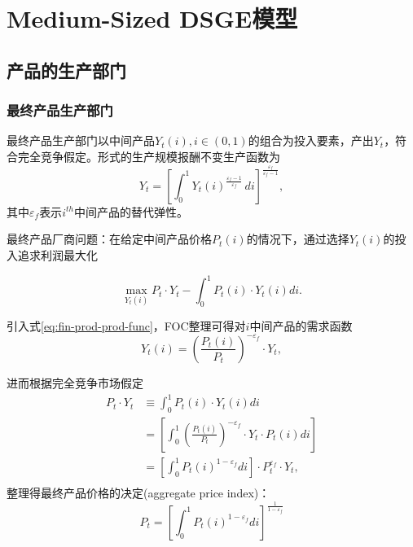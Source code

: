 \chapter{Medium-Sized DSGE模型}
\section{产品的生产部门}
\label{sec:production-sector}


\subsection{最终产品生产部门}
\label{sec:final-production-sector}
最终产品生产部门以中间产品$Y_t(i), i \in (0,1)$的组合为投入要素，产出$Y_t$，符合完全竞争假定。\cite{Dixit:1977tv}形式的生产规模报酬不变生产函数为
\begin{equation}
  \label{eq:fin-prod-prod-func-me}
  Y_t = \left[ \int_{0}^{1} Y_t(i)^{\frac{\varepsilon_{f} - 1}{\varepsilon_{f}}} \, di \right]^{\frac{\varepsilon_{f}}{\varepsilon_{f} - 1}},
\end{equation}
其中$\varepsilon_f$表示$i^{th}$中间产品的替代弹性。

最终产品厂商问题：在给定中间产品价格$P_t(i)$的情况下，通过选择$Y_t(i)$的投入追求利润最大化

\begin{equation*}
  \max_{Y_t(i)} P_t \cdot Y_t - \int_{0}^{1} P_t(i) \cdot Y_t(i) di.
\end{equation*}

引入式\eqref{eq:fin-prod-prod-func}，FOC整理可得对$i$中间产品的需求函数
\begin{equation}
  \label{eq:demand-for-intm-i}
  Y_t(i) = \left( \frac{P_t(i)}{P_t}
\right)^{-\varepsilon_f} \cdot Y_t,
\end{equation}

进而根据完全竞争市场假定
\begin{equation*}
  \begin{split}
    P_t \cdot Y_t & \equiv \int_0^1 P_t(i) \cdot Y_t(i) di \\
    &=\left[\int_0^1 \left(\frac{P_t(i)}{P_t}\right)^{-\varepsilon_f} \cdot Y_t \cdot P_t(i) di \right] \\
    &=\left[\int_0^1 P_t(i)^{1-\varepsilon_f} di \right] \cdot P_t^{\varepsilon_f} \cdot Y_t,\\
  \end{split}
\end{equation*}
整理得最终产品价格的决定(aggregate price index)：
\begin{equation}
  \label{eq:agg-price-index-me}
  P_t = \left[
    \int_0^1 P_t(i)^{1-\varepsilon_f} di
  \right]^{\frac{1}{1-\varepsilon_f}}
\end{equation}


